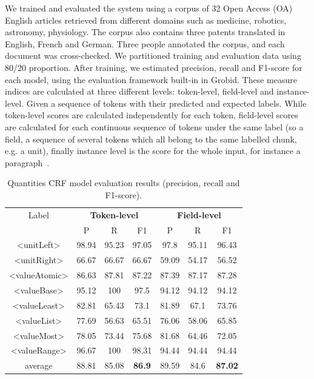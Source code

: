 \documentclass[sigconf]{acmart}
\begin{document}
We trained and evaluated the system using a corpus of 32 Open Access (OA) English articles retrieved from different domains such as medicine, robotics, astronomy, physiology. The corpus also contains three patents translated in English, French and German. Three people annotated the corpus, and each document was cross-checked. We partitioned training and evaluation data using 80/20 proportion. After training, we estimated precision, recall and F1-score for each model, using the evaluation framework built-in in Grobid. These measure indices are calculated at three different levels: token-level, field-level and instance-level. Given a sequence of tokens with their predicted and expected labels. While token-level scores are calculated independently for each token, field-level scores are calculated for each continuous sequence of tokens under the same label (so a field, a sequence of several tokens which all belong to the same labelled chunk, e.g. a unit), finally instance level is the score for the whole input, for instance a paragraph~\cite{foppiano2019proposal}. 

\begin{table}[ht]
   \caption{Quantities CRF model evaluation results (precision, recall and F1-score).}
   \label{tab:quantities-evaluation}
   \begin{tabular}{c|ccc|ccc}
       \toprule
       Label & \multicolumn{3}{c}{\textbf{Token-level}} & \multicolumn{3}{c}{\textbf{Field-level}}\\
        & P & R & F1 & P & R & F1 \\
       \midrule
       <unitLeft>    & 98.94 & 95.23 & 97.05 & 97.8  & 95.11 & 96.43\\
       <unitRight>   & 66.67 & 66.67 & 66.67 & 59.09 & 54.17 & 56.52\\
       <valueAtomic> & 86.63 & 87.81 & 87.22 & 87.39 & 87.17 & 87.28\\
       <valueBase>   & 95.12 & 100   & 97.5  & 94.12 & 94.12 & 94.12\\
       <valueLeast>  & 82.81 & 65.43 & 73.1  & 81.89 & 67.1  & 73.76\\
       <valueList>   & 77.69 & 56.63 & 65.51 & 76.06 & 58.06 & 65.85\\
       <valueMost>   & 78.05 & 73.44 & 75.68 & 81.68 & 64.46 & 72.05\\
       <valueRange>  & 96.67 & 100   & 98.31 & 94.44 & 94.44 & 94.44\\
       \midrule
       average       & 88.81  & 85.08 & \textbf{86.9} & 89.59 & 84.6 & \textbf{87.02}\\
       \bottomrule
   \end{tabular}
\end{table}
\end{document}
